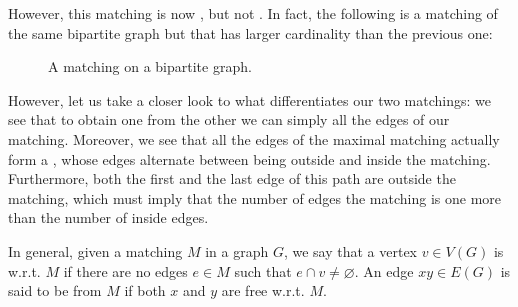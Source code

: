 \documentclass[a4paper, 12pt]{report}
\begin{document}
    However, this matching is now , but not . In fact, the following is a matching of the same bipartite graph but that has larger cardinality than the previous one:

    \begin{figure}[H]
        \centering
        \caption{A matching on a bipartite graph.}
    \end{figure}

    However, let us take a closer look to what differentiates our two matchings: we see that to obtain one from the other we can simply  all the edges of our matching. Moreover, we see that all the edges of the maximal matching actually form a , whose edges alternate between being outside and inside the matching. Furthermore, both the first and the last edge of this path are outside the matching, which must imply that the number of edges  the matching is one more than the number of inside edges.

    In general, given a matching $M$ in a graph $G$, we say that a vertex $v \in V(G)$ is  w.r.t. $M$ if there are no edges $e \in M$ such that $e \cap v \neq \varnothing$. An edge $xy \in E(G)$ is said to be  from $M$ if both $x$ and $y$ are free w.r.t. $M$.
\end{document}
